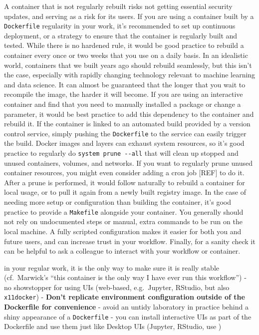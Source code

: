 \documentclass[10pt,letterpaper]{article}
\begin{document}
A container that is not regularly rebuilt risks not getting essential
security updates, and serving as a risk for its users. If you are using
a container built by a \texttt{Dockerfile} regularity in your work, it's
recommended to set up continuous deployment, or a strategy to ensure
that the container is regularly built and tested. While there is no
hardened rule, it would be good practice to rebuild a container every
once or two weeks that you use on a daily basis. In an idealistic world,
containers that we built years ago should rebuild seamlessly, but this
isn't the case, especially with rapidly changing technology relevant to
machine learning and data science. It can almost be guaranteed that the
longer that you wait to recompile the image, the harder it will become.
If you are using an interactive container and find that you need to
manually installed a package or change a parameter, it would be best
practice to add this dependency to the container and rebuild it. If the
container is linked to an automated build provided by a version control
service, simply pushing the \texttt{Dockerfile} to the service can
easily trigger the build. Docker images and layers can exhaust system
resources, so it's good practice to regularly do
\texttt{system\ prune\ -\/-all} that will clean up stopped and unused
containers, volumes, and networks. If you want to regularly prune unused
container resources, you might even consider adding a cron job {[}REF{]}
to do it. After a prune is performed, it would follow naturally to
rebuild a container for local usage, or to pull it again from a newly
built registry image. In the case of needing more setup or configuration
than building the container, it's good practice to provide a
\texttt{Makefile} alongside your container. You generally should not
rely on undocumented steps or manual, extra commands to be run on the
local machine. A fully scripted configuration makes it easier for both
you and future users, and can increase trust in your workflow. Finally,
for a sanity check it can be helpful to ask a colleague to interact with
your workflow or container.

in your regular work, it is the only way to make sure it is really
stable (cf.~Marwick's ``this container is the only way I have ever run
this workflow'') - no showstopper for using UIs (web-based,
e.g.~Jupyter, RStudio, but also \texttt{x11docker}) - \textbf{Don't
replicate environment configuration outside of the Dockerfile for
convenience} - avoid an untidy laboratory in practice behind a shiny
appearance of a \texttt{Dockerfile} - you can install interactive UIs as
part of the Dockerfile and use them just like Desktop UIs (Jupyter,
RStudio, use )
\end{document}
